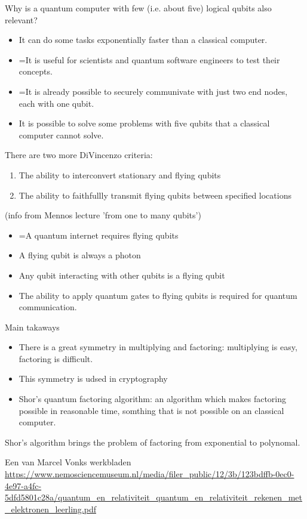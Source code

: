\documentclass[../../main.tex]{subfiles}
\begin{document}
{Why is a quantum computer with few (i.e. about five) logical qubits also relevant?
\begin{itemize}
\item It can do some tasks exponentially faster than a classical computer.
\item =It is useful for scientists and quantum software engineers to test their concepts.
\item =It is already possible to securely communivate with just two end nodes, each with one qubit.
\item It is possible to solve some problems with five qubits that a classical computer cannot solve.
\end{itemize}


There are two more DiVincenzo criteria:
\begin{enumerate}\addtocounter{enumi}{5}
\item The ability to interconvert stationary and flying qubits
\item The ability to faithfullly transmit flying qubits between specified locations
\end{enumerate}

(info from Mennos lecture 'from one to many qubits')

\begin{itemize}
\item =A quantum internet requires flying qubits
\item A flying qubit is always a photon
\item Any qubit interacting with other qubits is a flying qubit
\item The ability to apply quantum gates to flying qubits is required for quantum communication.
\end{itemize}
Main takaways

\begin{itemize}
\item There is a great symmetry in multiplying and factoring: multiplying is easy, factoring is difficult.
\item This symmetry is udsed in cryptography
\item Shor's quantum factoring algorithm: an algorithm which makes factoring possible in reasonable time, somthing that is not possible on an classical computer.
\end{itemize}
Shor's algorithm brings the problem of factoring from exponential to polynomal.


Een van Marcel Vonks werkbladen
\url{https://www.nemosciencemuseum.nl/media/filer_public/12/3b/123bdffb-0ec0-4e97-a4fc-5dfd5801c28a/quantum_en_relativiteit_quantum_en_relativiteit_rekenen_met_elektronen_leerling.pdf}

}
\end{document}
